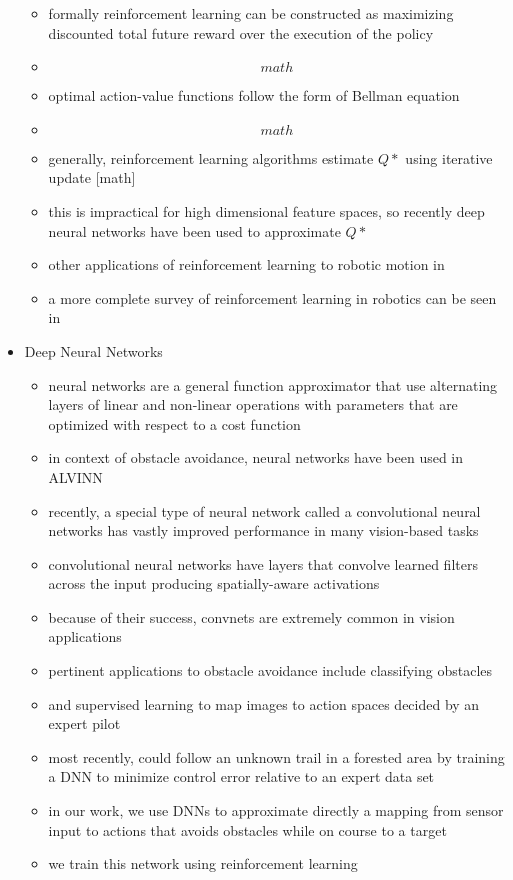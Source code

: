 \documentclass[paper=a4, fontsize=11pt]{scrartcl} %
\begin{document}
\begin{itemize}
\begin{itemize}
		\item formally reinforcement learning can be constructed as maximizing discounted total future reward over the execution of the policy
		\item \[math\]
		\item optimal action-value functions follow the form of Bellman equation
		\item \[math\]
		\item generally, reinforcement learning algorithms estimate $Q*$ using iterative update [math] \cite{Sutton:1998:IRL:551283}
		\item this is impractical for high dimensional feature spaces, so recently deep neural networks have been used to approximate $Q*$ \cite{Mnih2013}
		\item other applications of reinforcement learning to robotic motion in \cite{DBLP:conf/icra/KohlS04,DBLP:conf/iros/TedrakeZS04,geng2005fast,bagnell2001autonomous, riedmiller2009reinforcement}
		\item a more complete survey of reinforcement learning in robotics can be seen in \cite{kober2013reinforcement}
	\end{itemize}

\item Deep Neural Networks
	\begin{itemize}
		\item neural networks are a general function approximator that use alternating layers of linear and non-linear operations with parameters that are optimized with respect to a cost function
		\item in context of obstacle avoidance, neural networks have been used in ALVINN \cite{Pomerleau1989,Michels2005,riedmiller2009reinforcement}
		\item recently, a special type of neural network called a convolutional neural networks \cite{DBLP:journals/corr/SzegedyLJSRAEVR14} has vastly improved performance in many vision-based tasks
		\item convolutional neural networks have layers that convolve learned filters across the input producing spatially-aware activations
		\item because of their success, convnets are extremely common in vision applications
		\item pertinent applications to obstacle avoidance include classifying obstacles \cite{Hadsell2009}
		\item and supervised learning to map images to action spaces decided by an expert pilot \cite{Kim2015,Ross2013}
		\item most recently, \cite{Guisti2016} could follow an unknown trail in a forested area by training a DNN to minimize control error relative to an expert data set
		\item in our work, we use DNNs to approximate directly a mapping from sensor input to actions that avoids obstacles while on course to a target
		\item we train this network using reinforcement learning
	\end{itemize}


\end{itemize}
\end{document}
